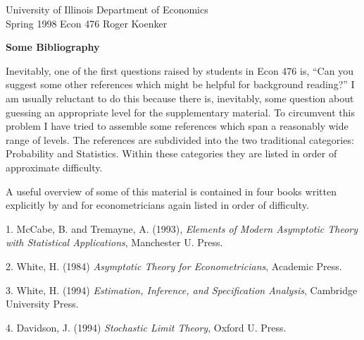 \setlength{\textwidth}{170mm}
\setlength{\textheight}{220mm}
\setlength{\oddsidemargin}{0mm}
\setlength{\evensidemargin}{10mm}
\setlength{\topmargin}{-10mm}
\def\RR{\hbox{\raise.4ex\hbox{$\scriptstyle{|}$}\hskip-1.85pt R}}
\newcommand{\REF}{\nopagebreak\noindent{\large{\bf
      References}}\vspace{.2in}}

\newcommand{\Ref}[1]{\medskip\noindent\hangafter=1
      \hangindent=20pt\ignorespaces #1}
\pagestyle{empty}



\noindent
University of Illinois \hfill Department of Economics \\
Spring 1998 \hfill Econ 476 \hfill Roger Koenker

\vspace{4mm}
\begin{center}

\large{
{\bf Some Bibliography }}
\end{center}

\vspace{10mm}
Inevitably, one of the first questions raised by students in Econ 476 is, ``Can you suggest some other references which might be helpful for 
background reading?''  I am usually reluctant to do this because there is, 
inevitably, some question about guessing an appropriate level for the 
supplementary material.  To circumvent this problem I have tried to 
assemble some references which span a reasonably wide range of levels.  The
references are subdivided into the two traditional categories:  Probability 
and Statistics.  Within these categories they are listed in order of 
approximate difficulty.

A useful overview of some of this material is contained in four books
written explicitly by and for econometricians again listed in order of
difficulty.

\vspace{2mm}

 1.   McCabe, B. and Tremayne, A. (1993), {\it Elements of Modern
Asymptotic Theory with Statistical Applications}, Manchester U. Press.

 2.  White, H. (1984) {\it Asymptotic Theory for Econometricians},
Academic Press.

 3. White, H. (1994) 
{\it Estimation, Inference, and Specification Analysis}, 
Cambridge University Press.

 4.  Davidson, J. (1994) {\it Stochastic Limit Theory}, Oxford U. Press.

